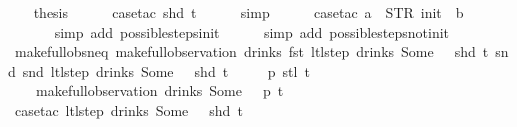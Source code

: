 \begin{isabellebody}
%
\isadelimproof
%
\endisadelimproof
%
\isatagproof
{}\isamarkupfalse%
{\isacharminus}\isanewline
\ \ \isamarkupfalse%
\ {\isacharquery}thesis\isanewline
\ \ \ \ \isamarkupfalse%
\ {\isacharparenleft}case{\isacharunderscore}tac\ {\isachardoublequoteopen}shd\ t{\isachardoublequoteclose}{\isacharparenright}\isanewline
\ \ \ \ \isamarkupfalse%
\ simp\isanewline
\ \ \ \ \isamarkupfalse%
\ {\isacharparenleft}case{\isacharunderscore}tac\ {\isachardoublequoteopen}a\ {\isacharequal}\ STR\ {\isacharprime}{\isacharprime}init{\isacharprime}{\isacharprime}\ {\isasymand}\ b\ {\isacharequal}\ {\isacharbrackleft}{\isacharbrackright}{\isachardoublequoteclose}{\isacharparenright}\isanewline
\ \ \ \ \ \isamarkupfalse%
\ {\isacharparenleft}simp\ add{\isacharcolon}\ possible{\isacharunderscore}steps{\isacharunderscore}init{\isacharparenright}\isanewline
\ \ \ \ \isamarkupfalse%
\ {\isacharparenleft}simp\ add{\isacharcolon}\ possible{\isacharunderscore}steps{\isacharunderscore}not{\isacharunderscore}init{\isacharparenright}\isanewline
{}\isamarkupfalse%
%
\endisatagproof
{\isafoldproof}%
%
\isadelimproof
\isanewline
%
\endisadelimproof
\isanewline
{}\isamarkupfalse%
\ make{\isacharunderscore}full{\isacharunderscore}obs{\isacharunderscore}neq{\isacharcolon}\ {\isachardoublequoteopen}make{\isacharunderscore}full{\isacharunderscore}observation\ drinks\ {\isacharparenleft}fst\ {\isacharparenleft}ltl{\isacharunderscore}step\ drinks\ {\isacharparenleft}Some\ {}{\isacharparenright}\ {\isacharless}{\isachargreater}\ {\isacharparenleft}shd\ t{\isacharparenright}{\isacharparenright}{\isacharparenright}\ {\isacharparenleft}snd\ {\isacharparenleft}snd\ {\isacharparenleft}ltl{\isacharunderscore}step\ drinks\ {\isacharparenleft}Some\ {}{\isacharparenright}\ {\isacharless}{\isachargreater}\ {\isacharparenleft}shd\ t{\isacharparenright}{\isacharparenright}{\isacharparenright}{\isacharparenright}\isanewline
\ \ \ \ \ p\ {\isacharparenleft}stl\ t{\isacharparenright}\ {\isasymnoteq}\isanewline
\ \ \ \ make{\isacharunderscore}full{\isacharunderscore}observation\ drinks\ {\isacharparenleft}Some\ {}{\isacharparenright}\ {\isacharless}{\isachargreater}\ p\ t{\isachardoublequoteclose}\isanewline
%
\isadelimproof
\ \ %
\endisadelimproof
%
\isatagproof
{}\isamarkupfalse%
\ {\isacharparenleft}case{\isacharunderscore}tac\ {\isachardoublequoteopen}ltl{\isacharunderscore}step\ drinks\ {\isacharparenleft}Some\ {}{\isacharparenright}\ {\isacharless}{\isachargreater}\ {\isacharparenleft}shd\ t{\isacharparenright}{\isachardoublequoteclose}{\isacharparenright}\isanewline

\end{isabellebody}
